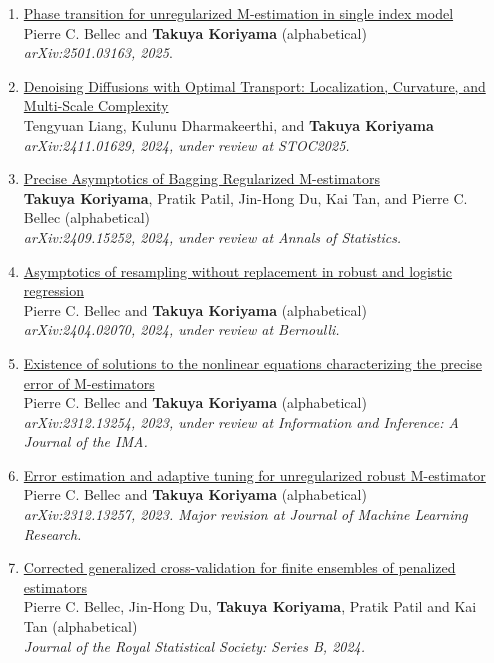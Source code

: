 \documentclass[10pt]{amsart}
\begin{document}
\begin{enumerate}
\item \href{https://arxiv.org/abs/2501.03163}{Phase transition for unregularized M-estimation in single index model} \\
Pierre C. Bellec and \textbf{Takuya Koriyama} (alphabetical)\\
\textit{arXiv:2501.03163, 2025}.
\item \href{https://arxiv.org/abs/2411.01629}{Denoising Diffusions with Optimal Transport: Localization, Curvature, and Multi-Scale Complexity}\\
Tengyuan Liang, Kulunu Dharmakeerthi, and \textbf{Takuya Koriyama} \\
\textit{arXiv:2411.01629, 2024, under review at \textit{STOC2025}.}
\item \href{https://arxiv.org/abs/2409.15252}{Precise Asymptotics of Bagging Regularized M-estimators}\\
\textbf{Takuya Koriyama}, Pratik Patil, Jin-Hong Du, Kai Tan, and Pierre C. Bellec (alphabetical) \\
\textit{arXiv:2409.15252, 2024, under review at Annals of Statistics.}
\item \href{https://arxiv.org/abs/2404.02070}{Asymptotics of resampling without replacement in robust and logistic regression}\\
Pierre C. Bellec and \textbf{Takuya Koriyama} (alphabetical)\\
\textit{arXiv:2404.02070, 2024, under review at Bernoulli.}

\item \href{https://arxiv.org/abs/2312.13254}{Existence of solutions to the nonlinear equations characterizing the precise error of M-estimators}\\
Pierre C. Bellec and \textbf{Takuya Koriyama} (alphabetical)\\
\textit{arXiv:2312.13254, 2023, under review at Information and Inference: A Journal of the IMA.}
\item \href{https://arxiv.org/abs/2312.13257}{Error estimation and adaptive tuning for unregularized robust M-estimator}\\
Pierre C. Bellec and \textbf{Takuya Koriyama} (alphabetical)\\
\textit{arXiv:2312.13257, 2023. Major revision at Journal of Machine Learning Research.} 
\item \href{https://arxiv.org/abs/2310.01374}{Corrected generalized cross-validation for finite ensembles of penalized estimators}\\
Pierre C. Bellec, Jin-Hong Du, \textbf{Takuya Koriyama}, Pratik Patil and Kai Tan (alphabetical)\\
\textit{Journal of the Royal Statistical Society: Series B, 2024.} 


\end{enumerate}
\end{document}
